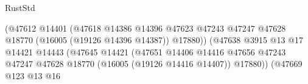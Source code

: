 \begin{lexlean}{RustStd}
\begin{coremodule}
                                                                (@47612
                                                                  @14401
                                                                  (@47618
                                                                    @14386
                                                                    @14396
                                                                    @47623
                                                                    @47243
                                                                    @47247
                                                                    @47628
                                                                    @18770
                                                                    (@16005 (@19126 @14396 @14387))
                                                                    @17880))
                                                                (@47638
                                                                  @3915
                                                                  @13
                                                                  @17
                                                                  @14421
                                                                  @14443
                                                                  (@47645
                                                                    @14421
                                                                    (@47651
                                                                      @14406
                                                                      @14416
                                                                      @47656
                                                                      @47243
                                                                      @47247
                                                                      @47628
                                                                      @18770
                                                                      (@16005
                                                                        (@19126 @14416 @14407))
                                                                      @17880))
                                                                  (@47669
                                                                    @123
                                                                    @13
                                                                    @16

\end{coremodule}
\end{lexlean}
